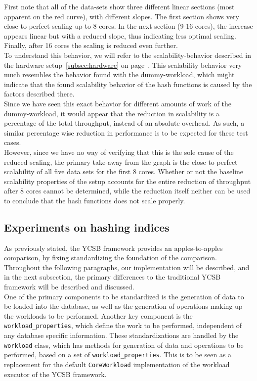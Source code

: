 \documentclass[11pt]{article} %
\begin{document}
First note that all of the data-sets show three different linear sections (most apparent on the red curve), with different slopes. The first section shows very close to perfect scaling up to 8 cores. In the next section (9-16 cores), the increase appears linear but with a reduced slope, thus indicating less optimal scaling. Finally, after 16 cores the scaling is reduced even further. \\

To understand this behavior, we will refer to the scalability-behavior described in the hardware setup~\ref{subsec:hardware} on page~\pageref{subsec:hardware}. This scalability behavior very much resembles the behavior found with the dummy-workload, which might indicate that the found scalability behavior of the hash functions is caused by the factors described there. \\

Since we have seen this exact behavior for different amounts of work of the dummy-workload, it would appear that the reduction in scalability is a percentage of the total throughput, instead of an absolute overhead. As such, a similar percentage wise reduction in performance is to be expected for these test cases. \\

However, since we have no way of verifying that this is the sole cause of the reduced scaling, the primary take-away from the graph is the close to perfect scalability of all five data sets for the first 8 cores. Whether or not the baseline scalability properties of the setup accounts for the entire reduction of throughput after 8 cores cannot be determined, while the reduction itself neither can be used to conclude that the hash functions does not scale properly.

\subsection{Experiments on hashing indices}
As previously stated, the YCSB framework provides an apples-to-apples comparison, by fixing standardizing the foundation of the comparison. Throughout the following paragraphs, our implementation will be described, and in the next subsection, the primary differences to the traditional YCSB framework will be described and discussed.\\

One of the primary components to be standardized is the generation of data to be loaded into the database, as well as the generation of operations making up the workloads to be performed. Another key component is the \verb|workload_properties|, which define the work to be performed, independent of any database specific information. These standardizations are handled by the \verb|workload| class, which has methods for generation of data and operations to be performed, based on a set of \verb|workload_properties|. This is to be seen as a replacement for the default \verb|CoreWorkload| implementation of the workload executor of the YCSB framework.\\
\end{document}

